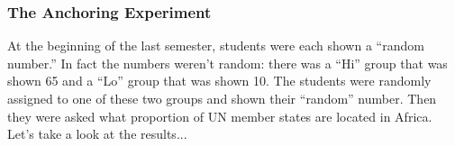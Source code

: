 \documentclass[handout]{beamer}
\begin{document}
\begin{frame}
\frametitle{The Anchoring Experiment}
At the beginning of the last semester, students were each shown a ``random number.'' In fact the numbers weren't random: there was a ``Hi'' group that was shown 65 and a ``Lo'' group that was shown 10. The students were randomly assigned to one of these two groups and shown their ``random'' number. Then they were asked what proportion of UN member states are located in Africa.  Let's take a look at the results...


\end{frame}

\end{document}
